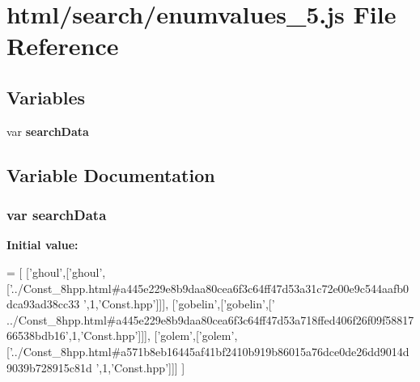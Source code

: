 \section{html/search/enumvalues\-\_\-5.js File Reference}
\label{enumvalues__5_8js}
\subsection*{Variables}
\begin{DoxyCompactItemize}
\item 
var {\bf search\-Data}
\end{DoxyCompactItemize}


\subsection{Variable Documentation}
\subsubsection[{search\-Data}]{\setlength{\rightskip}{0pt plus 5cm}var search\-Data}\label{enumvalues__5_8js_ad01a7523f103d6242ef9b0451861231e}
{\bfseries Initial value\-:}
\begin{DoxyCode}
=
[
  [\textcolor{stringliteral}{'ghoul'},[\textcolor{stringliteral}{'ghoul'},[\textcolor{stringliteral}{'../Const\_8hpp.html#a445e229e8b9daa80cea6f3c64ff47d53a31c72e00e9c544aafb0dca93ad38cc33
      '},1,\textcolor{stringliteral}{'Const.hpp'}]]],
  [\textcolor{stringliteral}{'gobelin'},[\textcolor{stringliteral}{'gobelin'},[\textcolor{stringliteral}{'
      ../Const\_8hpp.html#a445e229e8b9daa80cea6f3c64ff47d53a718ffed406f26f09f5881766538bdb16'},1,\textcolor{stringliteral}{'Const.hpp'}]]],
  [\textcolor{stringliteral}{'golem'},[\textcolor{stringliteral}{'golem'},[\textcolor{stringliteral}{'../Const\_8hpp.html#a571b8eb16445af41bf2410b919b86015a76dce0de26dd9014d9039b728915c81d
      '},1,\textcolor{stringliteral}{'Const.hpp'}]]]
]
\end{DoxyCode}
